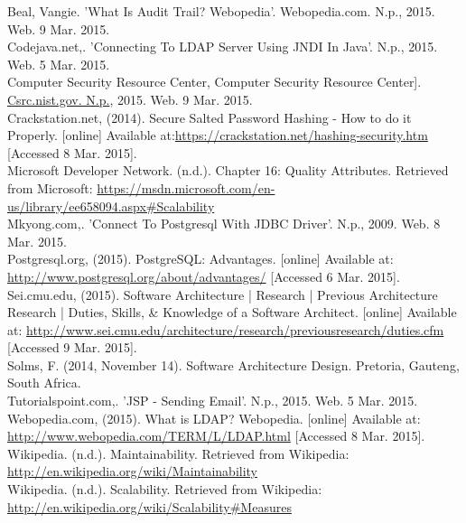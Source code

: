 Beal, Vangie. 'What Is Audit Trail? Webopedia'. Webopedia.com. N.p., 2015. Web. 9 Mar. 2015.\\

Codejava.net,. 'Connecting To LDAP Server Using JNDI In Java'. N.p., 2015. Web. 5 Mar. 2015.\\

Computer Security Resource Center, Computer Security Resource Center]. \url{Csrc.nist.gov. N.p.}, 2015. Web. 9 Mar. 2015.\\

Crackstation.net, (2014). Secure Salted Password Hashing - How to do it Properly. [online] Available at:\url{https://crackstation.net/hashing-security.htm} [Accessed 8 Mar. 2015].\\

Microsoft Developer Network. (n.d.). Chapter 16: Quality Attributes. Retrieved from Microsoft: \url{https://msdn.microsoft.com/en-us/library/ee658094.aspx#Scalability}\\

Mkyong.com,. 'Connect To Postgresql With JDBC Driver'. N.p., 2009. Web. 8 Mar. 2015.\\

Postgresql.org, (2015). PostgreSQL: Advantages. [online] Available at: \url{http://www.postgresql.org/about/advantages/} [Accessed 6 Mar. 2015].\\

Sei.cmu.edu, (2015). Software Architecture | Research | Previous Architecture Research | Duties, Skills, \& Knowledge of a Software Architect. [online] Available at: \url{http://www.sei.cmu.edu/architecture/research/previousresearch/duties.cfm} [Accessed 9 Mar. 2015]. \\

Solms, F. (2014, November 14). Software Architecture Design. Pretoria, Gauteng, South Africa.\\

Tutorialspoint.com,. 'JSP - Sending Email'. N.p., 2015. Web. 5 Mar. 2015.\\

Webopedia.com, (2015). What is LDAP? Webopedia. [online] Available at: \url{http://www.webopedia.com/TERM/L/LDAP.html} [Accessed 8 Mar. 2015].\\

Wikipedia. (n.d.). Maintainability. Retrieved from Wikipedia: \url{http://en.wikipedia.org/wiki/Maintainability}\\

Wikipedia. (n.d.). Scalability. Retrieved from Wikipedia: \url{http://en.wikipedia.org/wiki/Scalability#Measures}\\




